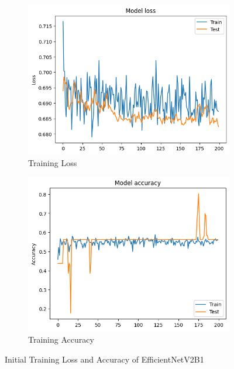 \documentclass[]{final_report}
\begin{document}

\begin{figure}[ht!]
  \centering
  \begin{subfigure}{0.4\textwidth}
    \includegraphics[width=\linewidth]{images/EfficientNetV2B1-initial-training-loss.png}
    \caption{Training Loss}
    \label{fig:EfficientNetV2B1-initial-training-loss}
  \end{subfigure}
  \begin{subfigure}{0.4\textwidth}
    \includegraphics[width=\linewidth]{images/EfficientNetV2B1-initial-training-accuracy.png}
    \caption{Training Accuracy}
    \label{fig:EfficientNetV2B1-initial-training-accuracy}
  \end{subfigure}
  \caption{Initial Training Loss and Accuracy of EfficientNetV2B1}
  \label{fig:EfficientNetV2B1-initial-training}
\end{figure}
\end{document}
